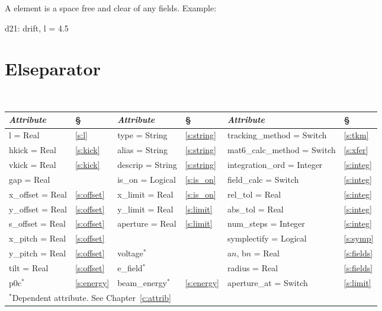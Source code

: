 A  element is a space free and clear of any fields.
Example:
\begin{example}
  d21: drift, l = 4.5
\end{example}

\section{Elseparator}
\label{s:elsep}

\begin{center}
\tt
\begin{tabular}{|l|l||l|l||l|l|} \hline
  {\sl Attribute} & \S  & {\sl Attribute} & \S & {\sl Attribute} & \S \\ \hline
  l        = Real    & \ref{s:l}      & type = String    & \ref{s:string} & tracking\_method = Switch   & \ref{s:tkm}    \\ \hline
  hkick    = Real    & \ref{s:kick}   & alias = String   & \ref{s:string} & mat6\_calc\_method = Switch & \ref{s:xfer}   \\ \hline
  vkick    = Real    & \ref{s:kick}   & descrip = String & \ref{s:string} & integration\_ord = Integer  & \ref{s:integ}  \\ \hline
  gap      = Real    &                & is\_on = Logical & \ref{s:is_on}  & field\_calc = Switch        & \ref{s:integ}  \\ \hline
  x\_offset  = Real  & \ref{s:offset} & x\_limit = Real  & \ref{s:is_on}  & rel\_tol = Real             & \ref{s:integ}  \\ \hline
  y\_offset  = Real  & \ref{s:offset} & y\_limit = Real  & \ref{s:limit}  & abs\_tol = Real             & \ref{s:integ}  \\ \hline
  s\_offset  = Real  & \ref{s:offset} & aperture = Real  & \ref{s:limit}  & num\_steps = Integer        & \ref{s:integ}  \\ \hline
  x\_pitch = Real    & \ref{s:offset} &                  &                & symplectify = Logical       & \ref{s:symp}   \\ \hline
  y\_pitch = Real    & \ref{s:offset} & voltage$^*$      &                & a$n$, b$n$ = Real           & \ref{s:fields} \\ \hline
  tilt     = Real    & \ref{s:offset} & e\_field$^*$     &                & radius = Real               & \ref{s:fields} \\ \hline
  p0c$^*$            & \ref{s:energy} & beam\_energy$^*$ & \ref{s:energy} & aperture\_at = Switch       & \ref{s:limit}  \\ \hline
  \multicolumn{6}{l}{\small $^*$Dependent attribute. See Chapter~\ref{c:attrib}} \\
\end{tabular}
\end{center}
\toffset

